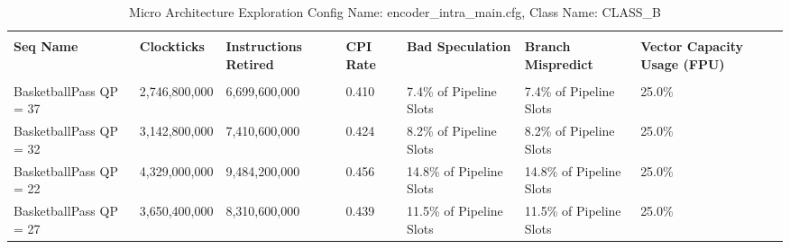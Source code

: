 \documentclass{article}%
\begin{document}
\newpage%
\begin{longtabu}{| X[l] | X[l] | X[l] | X[l] | X[l] | X[l] | X[l] |}%
\caption{%
Micro Architecture Exploration\newline%
 Config Name: encoder\_intra\_main.cfg,\newline%
 Class Name: CLASS\_B\newline%
%
}%
\hline%
&&&&&&\\%
\textbf{Seq Name}&\textbf{Clockticks}&\textbf{Instructions Retired}&\textbf{CPI Rate}&\textbf{Bad Speculation}&\textbf{Branch Mispredict}&\textbf{Vector Capacity Usage (FPU)}\\%
&&&&&&\\%
\hline%
\endhead%
BasketballPass\newline%
 QP = 37&2,746,800,000&6,699,600,000&0.410&7.4\% of Pipeline Slots&7.4\% of Pipeline Slots&25.0\%\\%
\hline%
BasketballPass\newline%
 QP = 32&3,142,800,000&7,410,600,000&0.424&8.2\% of Pipeline Slots&8.2\% of Pipeline Slots&25.0\%\\%
\hline%
BasketballPass\newline%
 QP = 22&4,329,000,000&9,484,200,000&0.456&14.8\% of Pipeline Slots&14.8\% of Pipeline Slots&25.0\%\\%
\hline%
BasketballPass\newline%
 QP = 27&3,650,400,000&8,310,600,000&0.439&11.5\% of Pipeline Slots&11.5\% of Pipeline Slots&25.0\%\\%
\hline%
\end{longtabu}%
\end{document}
